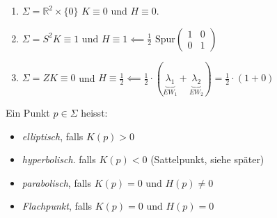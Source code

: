 \documentclass[../main.tex]{subfiles}
\begin{document}
\begin{examples}
    \leavevmode
    \begin{enumerate}
       \item $\Sigma = \mathbb{R}^{2} \times \{0\}$ \qquad $K\equiv 0$ und $H\equiv 0$.
       \item $\Sigma = S^{2}$\qquad $K \equiv 1 \text{ und } H\equiv 1 \impliedby \frac{1}{2}\text{ Spur}\begin{pmatrix}
           1 & 0 \\
           0 & 1
       \end{pmatrix}$
       \item $\Sigma = Z$\qquad $K\equiv 0$ und $H\equiv \frac{1}{2} \impliedby \frac{1}{2} \cdot (\underbrace{\lambda_{1}}_{EW_{1}} + \underbrace{\lambda_{2}}_{EW_{2}}) = \frac{1}{2} \cdot (1 + 0)$ 
    \end{enumerate}
\end{examples}

\begin{notation}
    Ein Punkt $p\in \Sigma$ heisst: \\
    \begin{minipage}[c][10em]{0.7\columnwidth}
            \begin{itemize}
                \item \emph{elliptisch}, falls $K(p) > 0$
                \item \emph{hyperbolisch}. falls $K(p) < 0$ (Sattelpunkt, siehe später)
                \item \emph{parabolisch}, falls $K(p) = 0 \text{ und } H(p) \neq 0$
                \item \emph{Flachpunkt}, falls $K(p) = 0 \text{ und } H(p) = 0$
            \end{itemize}
    \end{minipage}
    \begin{minipage}[c][10em]{0.25\columnwidth}
        \begin{figure}[H]
            \centering
            \def\svgwidth{0.7\textwidth}
            
        \end{figure}
    \end{minipage}
\end{notation}
\end{document}
